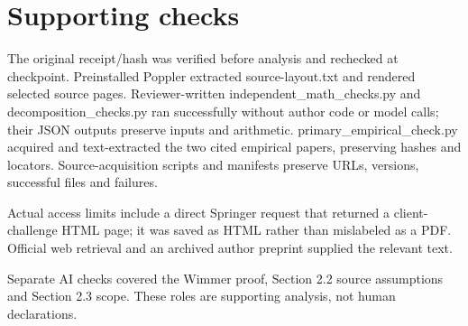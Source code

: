 \documentclass[10pt]{article}
\begin{document}
\section*{Supporting checks}
The original receipt/hash was verified before analysis and rechecked at checkpoint. Preinstalled Poppler extracted source-layout.txt and rendered selected source pages. Reviewer-written independent\_math\_checks.py and decomposition\_checks.py ran successfully without author code or model calls; their JSON outputs preserve inputs and arithmetic. primary\_empirical\_check.py acquired and text-extracted the two cited empirical papers, preserving hashes and locators. Source-acquisition scripts and manifests preserve URLs, versions, successful files and failures.\par
Actual access limits include a direct Springer request that returned a client-challenge HTML page; it was saved as HTML rather than mislabeled as a PDF. Official web retrieval and an archived author preprint supplied the relevant text.\par
Separate AI checks covered the Wimmer proof, Section 2.2 source assumptions and Section 2.3 scope. These roles are supporting analysis, not human declarations.\par
\end{document}
